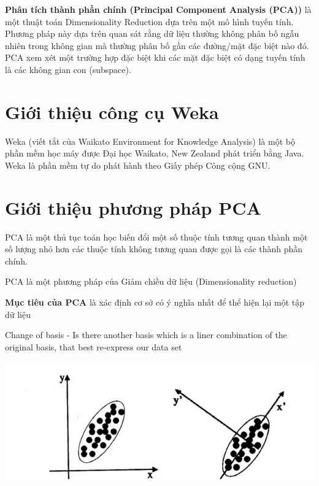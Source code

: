 \documentclass{hcmutarticle}
\begin{document}
\textbf{Phân tích thành phần chính (Principal Component Analysis (PCA))}
 là một thuật toán Dimensionality Reduction dựa trên một mô hình tuyến tính. Phương pháp này dựa trên quan sát rằng dữ liệu thường không phân bố ngẫu nhiên trong không gian mà thường phân bố gần các đường/mặt đặc biệt nào đó. PCA xem xét một trường hợp đặc biệt khi các mặt đặc biệt có dạng tuyến tính là các không gian con (subspace).

\newpage

\section{Giới thiệu công cụ Weka}\label{survey}
Weka (viết tắt của Waikato Environment for Knowledge Analysis) là một bộ phần mềm học máy được Đại học Waikato, New Zealand phát triển bằng Java. Weka là phần mềm tự do phát hành theo Giấy phép Công cộng GNU.

\section{Giới thiệu phương pháp PCA}\label{dev}

PCA là một thủ tục toán học biến đổi một số thuộc tính tương quan thành một số lượng nhỏ hơn các thuộc tính không tương quan được gọi là các thành phần chính.

PCA là một phương pháp của Giảm chiều dữ liệu (Dimensionality reduction)

\textbf{Mục tiêu của PCA } là xác định cơ sở có ý nghĩa nhất để thể hiện lại một tập dữ liệu


Change of basis
- Is there another basis which is a liner combination of the original basis, that best re-express our data set


\begin{center}
	\includegraphics[scale=0.5]{image/figure.png}
\end{center}
\end{document}
